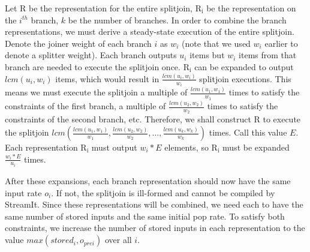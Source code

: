 
    Let $\mathrm{R}$ be the representation for the entire
splitjoin, $\mathrm{R_i}$ be the representation on the $i^{th}$
branch, $k$ be the number of branches. In order to combine the
branch representations, we must derive a steady-state execution of
the entire splitjoin. Denote the joiner weight of each branch $i$
as $w_i$ (note that we used $w_i$ earlier to denote a splitter
weight). Each branch outputs $u_i$ items but $w_i$ items from that
branch are needed to execute the splitjoin once. $\mathrm{R_i}$
can be expanded to output $lcm(u_i,w_i)$ items, which would result
in $\frac{lcm(u_i,w_i)}{w_i}$ splitjoin executions. This means we
must execute the splitjoin a multiple of
$\frac{lcm(u_1,w_1)}{w_1}$ times to satisfy the constraints of the
first branch, a multiple of $\frac{lcm(u_2,w_2)}{w_2}$ times to
satisfy the constraints of the second branch, etc. Therefore, we
shall construct $\mathrm{R}$ to execute the splitjoin
$lcm(\frac{lcm(u_1,w_1)}{w_1},\frac{lcm(u_2,w_2)}{w_2},...,\frac{lcm(u_k,w_k)}{w_k})$
times. Call this value $E$. Each representation $\mathrm{R_i}$
must output $w_i * E$ elements, so $\mathrm{R_i}$ must be expanded
$\frac{w_i * E}{u_i}$ times.

    After these expansions, each branch representation  should now
have the same input rate $o_i$. If not, the splitjoin is
ill-formed and cannot be compiled by StreamIt. Since these
representations will be combined, we need each to have the same
number of stored inputs and the same initial pop rate. To satisfy
both constraints, we increase the number of stored inputs in each
representation to the value $max(stored_i,o_{prei})$ over all $i$.

